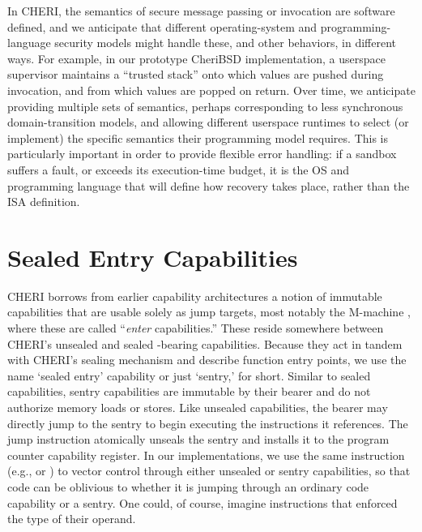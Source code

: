 In CHERI, the semantics of secure message passing or invocation are software defined, and we anticipate that different operating-system and programming-language security models might handle these, and other behaviors, in different ways.
For example, in our prototype CheriBSD implementation, a userspace supervisor maintains a ``trusted stack'' onto which values are pushed during invocation, and from which values are popped on return.
Over time, we anticipate providing multiple sets of semantics, perhaps corresponding to less synchronous domain-transition models, and allowing different userspace runtimes to select (or implement) the specific semantics their programming model requires.
This is particularly important in order to provide flexible error handling: if a sandbox suffers a fault, or exceeds its execution-time budget, it is the OS and programming language that will define how recovery takes place, rather than the ISA definition.

\section{Sealed Entry Capabilities}
\label{sec:arch-sentry}

CHERI borrows from earlier capability architectures a notion of immutable
capabilities that are usable solely as jump targets, most notably the
M-machine \cite{carter:mmachine94}, where these are called ``\emph{enter}
capabilities.''
%
These reside somewhere between CHERI's unsealed and sealed
\cappermX-bearing capabilities.  Because they act in tandem with
CHERI's sealing mechanism and describe function entry points, we use the
name `sealed entry' capability or just `sentry,' for short.
%
Similar to sealed capabilities, sentry capabilities are immutable by their
bearer and do not authorize memory loads or stores.  Like unsealed
capabilities, the bearer may directly jump to the sentry to begin executing
the instructions it references.  The jump instruction atomically unseals the
sentry and installs it to the program counter capability register.  In our
implementations, we use the same instruction (e.g.,  or
) to vector control through either unsealed or sentry
capabilities, so that code can be oblivious to whether it is jumping through
an ordinary code capability or a sentry.  One could, of course, imagine
instructions that enforced the type of their operand.

